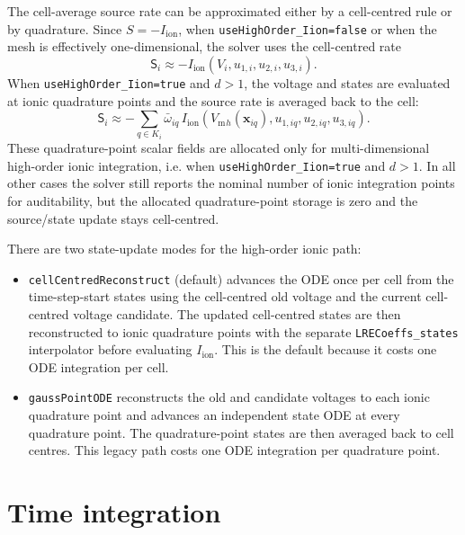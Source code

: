 \documentclass[11pt,a4paper]{article}
\newcommand{\code}[1]{\texttt{\small #1}}
\newcommand{\Vm}{V_{\text{m}}}
\newcommand{\Iion}{I_{\mathrm{ion}}}
\begin{document}
The cell-average source rate can be approximated either by a cell-centred rule
or by quadrature. Since $S=-\Iion$, when \code{useHighOrder\_Iion=false} or
when the mesh is effectively one-dimensional, the solver uses the
cell-centred rate
\begin{equation}
  \mathsf{S}_i
  \approx
  -\Iion(V_i,u_{1,i},u_{2,i},u_{3,i}).
\end{equation}
When \code{useHighOrder\_Iion=true} and $d>1$, the voltage and states are
evaluated at ionic quadrature points and the source rate is averaged back to
the cell:
\begin{equation}
  \mathsf{S}_i
  \approx
  -\sum_{q\in K_i}\bar{\omega}_{iq}\,
  \Iion
  \left(
    \Vm{}_{h}(\mathbf{x}_{iq}),
    u_{1,iq},
    u_{2,iq},
    u_{3,iq}
  \right).
  \label{eq:iion-quadrature}
\end{equation}
These quadrature-point scalar fields are allocated only for multi-dimensional
high-order ionic integration, i.e. when \code{useHighOrder\_Iion=true} and
$d>1$. In all other cases the solver still reports the nominal number of ionic
integration points for auditability, but the allocated quadrature-point storage
is zero and the source/state update stays cell-centred.

There are two state-update modes for the high-order ionic path:
\begin{itemize}
\item \code{cellCentredReconstruct} (default) advances the ODE once per cell
from the time-step-start states using the cell-centred old voltage and the
current cell-centred voltage candidate. The updated cell-centred states are
then reconstructed to ionic quadrature points with the separate
\code{LRECoeffs\_states} interpolator before evaluating $\Iion$. This is the
default because it costs one ODE integration per cell.
\item \code{gaussPointODE} reconstructs the old and candidate voltages to each
ionic quadrature point and advances an independent state ODE at every
quadrature point. The quadrature-point states are then averaged back to cell
centres. This legacy path costs one ODE integration per quadrature point.
\end{itemize}

\section{Time integration}
\end{document}
